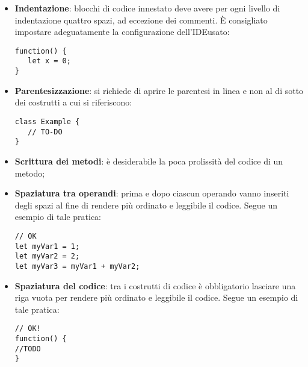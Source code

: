 		\begin{itemize}
			\item \textbf{Indentazione}: blocchi di codice innestato deve avere per ogni livello di indentazione quattro spazi, ad eccezione dei commenti. È consigliato impostare adeguatamente la configurazione dell'IDE\glo usato:
\begin{lstlisting}
function() {
   let x = 0;
}
\end{lstlisting}
			\item \textbf{Parentesizzazione}: si richiede di aprire le parentesi in linea e non al di sotto dei costrutti a cui si riferiscono:
			\begin{lstlisting}
class Example {
   // TO-DO
}
\end{lstlisting}
			\item \textbf{Scrittura dei metodi}: è desiderabile la poca prolissità del codice di un metodo;
			\item \textbf{Spaziatura tra operandi}: prima e dopo ciascun operando vanno
inseriti degli spazi al fine di rendere più ordinato e leggibile il codice.
Segue un esempio di tale pratica:
\begin{lstlisting}
// OK
let myVar1 = 1;
let myVar2 = 2;
let myVar3 = myVar1 + myVar2;
\end{lstlisting}
			\item \textbf{Spaziatura del codice}: tra i costrutti di codice è obbligatorio lasciare una riga vuota per rendere più ordinato e leggibile il codice. Segue un esempio di tale pratica:
			\begin{lstlisting}
// OK!
function() {
//TODO
}


\end{lstlisting}
\end{itemize}
